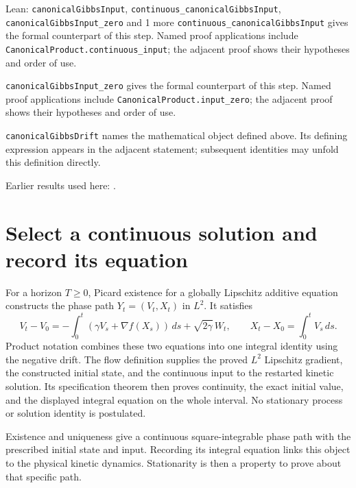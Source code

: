 \documentclass[11pt,a4paper]{article}
\begin{document}
\begin{leanbox}{Lean: \texttt{canonicalGibbsInput}, \texttt{continuous\_\allowbreak{}canonicalGibbsInput}, \texttt{canonicalGibbsInput\_\allowbreak{}zero} and 1 more}
\texttt{continuous\_\allowbreak{}canonical\allowbreak{}Gibbs\allowbreak{}Input} gives the formal counterpart of this step. Named proof applications include \texttt{Canonical\allowbreak{}Product.\allowbreak{}continuous\_\allowbreak{}input}; the adjacent proof shows their hypotheses and order of use.




\texttt{canonical\allowbreak{}Gibbs\allowbreak{}Input\_\allowbreak{}zero} gives the formal counterpart of this step. Named proof applications include \texttt{Canonical\allowbreak{}Product.\allowbreak{}input\_\allowbreak{}zero}; the adjacent proof shows their hypotheses and order of use.




\texttt{canonical\allowbreak{}Gibbs\allowbreak{}Drift} names the mathematical object defined above. Its defining expression appears in the adjacent statement; subsequent identities may unfold this definition directly.
\end{leanbox}


Earlier results used here: \cite[Section~3.13.2]{LangevinLean2026ULASC}.

\section{\texorpdfstring{Select a continuous solution and record its equation}{Select a continuous solution and record its equation}}


For a horizon \(T\ge0\), Picard existence for a globally Lipschitz additive equation constructs the phase path \(Y_t=(V_t,X_t)\) in \(L^{2}\). It satisfies \[V_t-V_0=-\int_0^t(\gamma V_s+\nabla f(X_s))\,ds+\sqrt{2\gamma}\,W_t,\qquad X_t-X_0=\int_0^t V_s\,ds.\] Product notation combines these two equations into one integral identity using the negative drift. The flow definition supplies the proved \(L^{2}\) Lipschitz gradient, the constructed initial state, and the continuous input to the restarted kinetic solution. Its specification theorem then proves continuity, the exact initial value, and the displayed integral equation on the whole interval. No stationary process or solution identity is postulated.



Existence and uniqueness give a continuous square-integrable phase path with the prescribed initial state and input. Recording its integral equation links this object to the physical kinetic dynamics. Stationarity is then a property to prove about that specific path.
\end{document}
